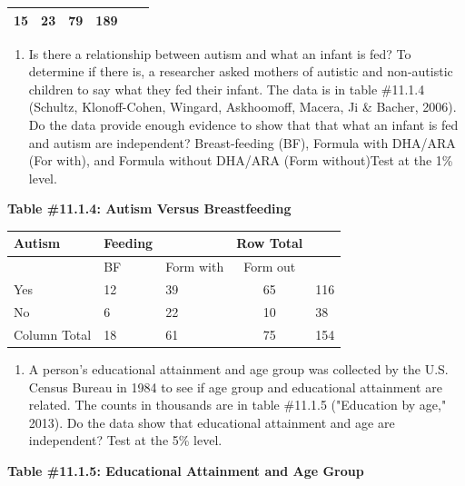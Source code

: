 \documentclass[
]{book}
\providecommand{\tightlist}{%
  \setlength{\itemsep}{0pt}\setlength{\parskip}{0pt}}
\begin{document}
\begin{longtable}[]{@{}llllll@{}}
\begin{minipage}[t]{0.09\columnwidth}
15\strut
\end{minipage} & \begin{minipage}[t]{0.14\columnwidth}\raggedright
23\strut
\end{minipage} & \begin{minipage}[t]{0.12\columnwidth}\raggedright
79\strut
\end{minipage} & \begin{minipage}[t]{0.07\columnwidth}\raggedright
189\strut
\end{minipage}\tabularnewline
\bottomrule
\end{longtable}

\begin{enumerate}
\def\labelenumi{\arabic{enumi}.}
\setcounter{enumi}{2}
\tightlist
\item
  Is there a relationship between autism and what an infant is fed? To determine if there is, a researcher asked mothers of autistic and non-autistic children to say what they fed their infant. The data is in table \#11.1.4 (Schultz, Klonoff-Cohen, Wingard, Askhoomoff, Macera, Ji \& Bacher, 2006). Do the data provide enough evidence to show that that what an infant is fed and autism are independent? Breast-feeding (BF), Formula with DHA/ARA (For with), and Formula without DHA/ARA (Form without)Test at the 1\% level.
\end{enumerate}

\textbf{Table \#11.1.4: Autism Versus Breastfeeding}

\begin{longtable}[]{@{}lllcl@{}}
\toprule
Autism & Feeding & & Row Total &\tabularnewline
\midrule
\endhead
& BF & Form with & Form out &\tabularnewline
Yes & 12 & 39 & 65 & 116\tabularnewline
No & 6 & 22 & 10 & 38\tabularnewline
Column Total & 18 & 61 & 75 & 154\tabularnewline
\bottomrule
\end{longtable}

\begin{enumerate}
\def\labelenumi{\arabic{enumi}.}
\setcounter{enumi}{3}
\tightlist
\item
  A person's educational attainment and age group was collected by the U.S. Census Bureau in 1984 to see if age group and educational attainment are related. The counts in thousands are in table \#11.1.5 ("Education by age," 2013). Do the data show that educational attainment and age are independent? Test at the 5\% level.
\end{enumerate}

\textbf{Table \#11.1.5: Educational Attainment and Age Group}
\end{document}

